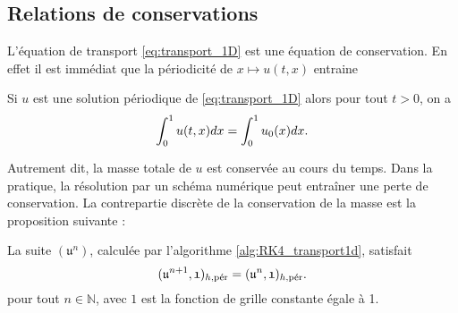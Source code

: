 \subsection{Relations de conservations}

L'équation de transport \eqref{eq:transport_1D} est une équation de conservation. En effet il est immédiat que la périodicité de $x \mapsto u(t,x)$ entraine

\begin{proposition}
Si $u$ est une solution périodique de \eqref{eq:transport_1D} alors pour tout $t>0$, on a
\begin{equation}
\gint_0^1 u(t,x)dx = \gint_0^1 u_0(x)dx.
\end{equation}
\end{proposition}

Autrement dit, la masse totale de $u$ est conservée au cours du temps. Dans la pratique, la résolution par un schéma numérique peut entraîner une perte de conservation. 
La contrepartie discrète de la conservation de la masse est la proposition suivante :

\begin{proposition}
La suite $(\mathfrak{u}^n)$, calculée par l'algorithme \ref{alg:RK4_transport1d}, satisfait
\begin{equation}
(\mathfrak{u}^{n+1}, \mathfrak{1})_{h,\per} = (\mathfrak{u}^n, \mathfrak{1})_{h,\per}.
\end{equation}
pour tout $n \in \mathbb{N}$, avec $\mathfrak{1}$ est la fonction de grille constante égale à 1.
\end{proposition}

